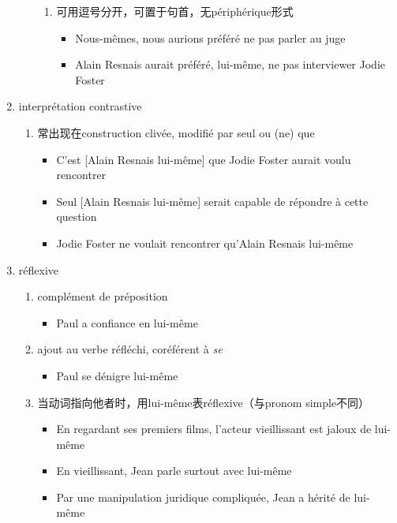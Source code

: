 \documentclass[UTF8]{report}
\begin{document}
\begin{enumerate}
\begin{enumerate}
        \begin{enumerate}
            \item 可用逗号分开，可置于句首，无périphérique形式
            \begin{itemize}
                \item Nous-mêmes, nous aurions préféré ne pas parler au juge
                \item Alain Resnais aurait préféré, lui-même, ne pas interviewer Jodie Foster
            \end{itemize}
        \end{enumerate}
    \end{enumerate}
    \item interprétation contrastive
    \begin{enumerate}
        \item 常出现在construction clivée, modifié par seul ou (ne) que
        \begin{itemize}
            \item C’est [Alain Resnais lui-même] que Jodie Foster aurait voulu rencontrer
            \item Seul [Alain Resnais lui-même] serait capable de répondre à cette question
            \item Jodie Foster ne voulait rencontrer qu’Alain Resnais lui-même
        \end{itemize}
    \end{enumerate}
    \item réflexive
    \begin{enumerate}
        \item complément de préposition
        \begin{itemize}
            \item Paul a confiance en lui-même
        \end{itemize}
        \item ajout au verbe réfléchi, coréférent à \textit{se}
        \begin{itemize}
            \item Paul se dénigre lui-même
        \end{itemize}
        \item 当动词指向他者时，用lui-même表réflexive（与pronom simple不同）
        \begin{itemize}
            \item En regardant ses premiers films, l’acteur vieillissant est jaloux de lui-même 
            \item En vieillissant, Jean parle surtout avec lui-même
            \item Par une manipulation juridique compliquée, Jean a hérité de lui-même
        \end{itemize}
    \end{enumerate}
\end{enumerate}
\end{document}
